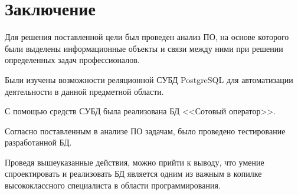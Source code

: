 \newpage

\section*{Заключение}\label{sec:conclusion}

Для решения поставленной цели был проведен анализ ПО, на основе которого были выделены информационные объекты и связи между ними при решении определенных задач профессионалов.

Были изучены возможности реляционной СУБД PostgreSQL для автоматизации деятельности в данной предметной области.

С помощью средств СУБД была реализована БД <<Сотовый оператор>>.

Согласно поставленным в анализе ПО задачам, было проведено тестирование разработанной БД.

Проведя вышеуказанные действия, можно прийти к выводу, что умение спроектировать и реализовать БД является одним из важным в копилке высококлассного специалиста в области программирования.

\newpage